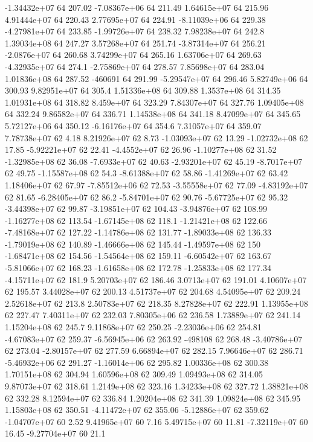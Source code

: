 -1.34432e+07 64 207.02
-7.08367e+06 64 211.49
1.64615e+07 64 215.96
4.91444e+07 64 220.43
2.77695e+07 64 224.91
-8.11039e+06 64 229.38
-4.27981e+07 64 233.85
-1.99726e+07 64 238.32
7.98238e+07 64 242.8
1.39034e+08 64 247.27
3.57268e+07 64 251.74
-3.87314e+07 64 256.21
-2.0876e+07 64 260.68
3.74299e+07 64 265.16
1.63706e+07 64 269.63
-4.32935e+07 64 274.1
-2.75869e+07 64 278.57
7.85698e+07 64 283.04
1.01836e+08 64 287.52
-460691 64 291.99
-5.29547e+07 64 296.46
5.82749e+06 64 300.93
9.82951e+07 64 305.4
1.51336e+08 64 309.88
1.3537e+08 64 314.35
1.01931e+08 64 318.82
8.459e+07 64 323.29
7.84307e+07 64 327.76
1.09405e+08 64 332.24
9.86582e+07 64 336.71
1.14538e+08 64 341.18
8.47099e+07 64 345.65
5.72127e+06 64 350.12
-6.16176e+07 64 354.6
7.31057e+07 64 359.07
7.78738e+07 62 4.18
8.21926e+07 62 8.73
-1.03093e+07 62 13.29
-1.02732e+08 62 17.85
-5.92221e+07 62 22.41
-4.4552e+07 62 26.96
-1.10277e+08 62 31.52
-1.32985e+08 62 36.08
-7.6933e+07 62 40.63
-2.93201e+07 62 45.19
-8.7017e+07 62 49.75
-1.15587e+08 62 54.3
-8.61388e+07 62 58.86
-1.41269e+07 62 63.42
1.18406e+07 62 67.97
-7.85512e+06 62 72.53
-3.55558e+07 62 77.09
-4.83192e+07 62 81.65
-6.28405e+07 62 86.2
-5.84701e+07 62 90.76
-5.67725e+07 62 95.32
-3.44398e+07 62 99.87
-3.19851e+07 62 104.43
-3.94876e+07 62 108.99
-1.16277e+08 62 113.54
-1.67145e+08 62 118.1
-1.21421e+08 62 122.66
-7.48168e+07 62 127.22
-1.14786e+08 62 131.77
-1.89033e+08 62 136.33
-1.79019e+08 62 140.89
-1.46666e+08 62 145.44
-1.49597e+08 62 150
-1.68471e+08 62 154.56
-1.54564e+08 62 159.11
-6.60542e+07 62 163.67
-5.81066e+07 62 168.23
-1.61658e+08 62 172.78
-1.25833e+08 62 177.34
-4.15711e+07 62 181.9
5.20703e+07 62 186.46
3.0713e+07 62 191.01
4.10607e+07 62 195.57
3.44028e+07 62 200.13
4.51737e+07 62 204.68
4.54095e+07 62 209.24
2.52618e+07 62 213.8
2.50783e+07 62 218.35
8.27828e+07 62 222.91
1.13955e+08 62 227.47
7.40311e+07 62 232.03
7.80305e+06 62 236.58
1.73889e+07 62 241.14
1.15204e+08 62 245.7
9.11868e+07 62 250.25
-2.23036e+06 62 254.81
-4.67083e+07 62 259.37
-6.56945e+06 62 263.92
-498108 62 268.48
-3.40786e+07 62 273.04
-2.80157e+07 62 277.59
6.66894e+07 62 282.15
7.96646e+07 62 286.71
-5.46932e+06 62 291.27
-1.16014e+06 62 295.82
1.00336e+08 62 300.38
1.70151e+08 62 304.94
1.60596e+08 62 309.49
1.09493e+08 62 314.05
9.87073e+07 62 318.61
1.2149e+08 62 323.16
1.34233e+08 62 327.72
1.38821e+08 62 332.28
8.12594e+07 62 336.84
1.20204e+08 62 341.39
1.09824e+08 62 345.95
1.15803e+08 62 350.51
-4.11472e+07 62 355.06
-5.12886e+07 62 359.62
-1.04707e+07 60 2.52
9.41965e+07 60 7.16
5.49715e+07 60 11.81
-7.32119e+07 60 16.45
-9.27704e+07 60 21.1
